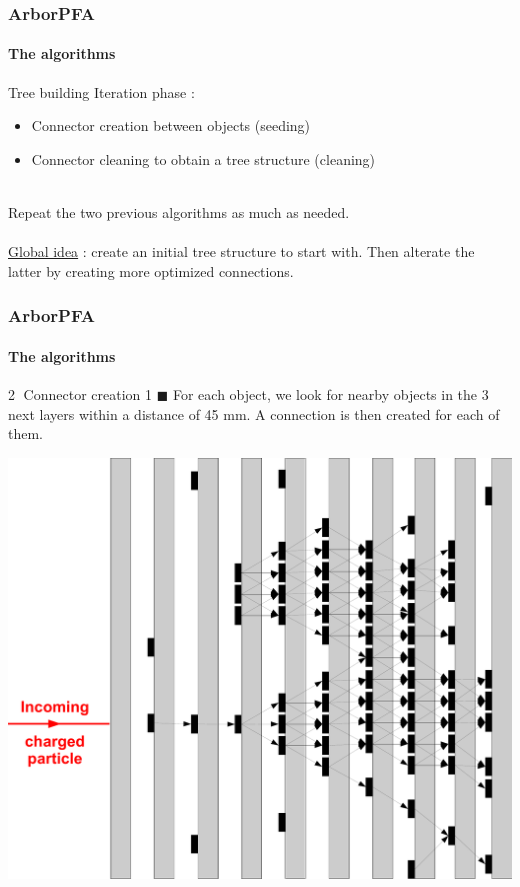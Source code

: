 \documentclass[8pt]{beamer}
\begin{document}
  
  \begin{frame}
  \frametitle{ArborPFA}
  \framesubtitle{The algorithms}
    \begin{block}{Tree building}
      Iteration phase :
      \begin{itemize}
        \item Connector creation between objects (seeding)
        \item Connector cleaning to obtain a tree structure (cleaning)
      \end{itemize}
      ~ \\
      Repeat the two previous algorithms as much as needed. \\ ~ \\
      \underline{Global idea} : create an initial tree structure to start with. Then alterate the latter by creating more optimized connections.
    \end{block}
  \end{frame}
  
  
  \begin{frame}
  \frametitle{ArborPFA}
  \framesubtitle{The algorithms}
    \begin{block}{\textcircled{{\small 2}} Connector creation 1}
      $\blacksquare$ 
      For each object, we look for nearby objects in the 3 next layers within a distance of 45 mm. A connection is then created for each of them.
    \end{block}
    \begin{center}
      \includegraphics[width=0.6\linewidth]{ConnectorSeeding1.pdf} \\ ~ \\
    \end{center}
  \end{frame}
  
\end{document}

